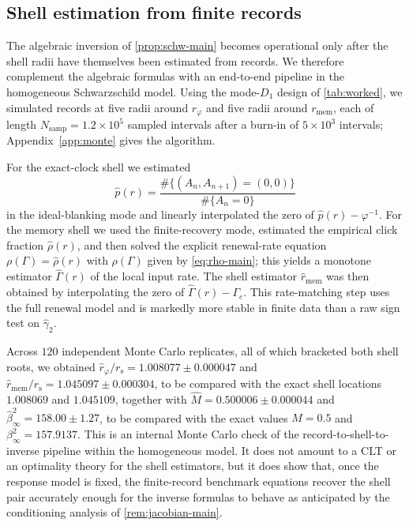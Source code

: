 \documentclass[11pt]{article}
\theoremstyle{definition}
\begin{document}


\subsection{Shell estimation from finite records}\label{subsec:noisy-inverse}

The algebraic inversion of \cref{prop:schw-main} becomes operational only after the shell radii have themselves been estimated from records. We therefore complement the algebraic formulas with an end-to-end pipeline in the homogeneous Schwarzschild model. Using the mode-$D_1$ design of \cref{tab:worked}, we simulated records at five radii around $r_\varphi$ and five radii around $r_{\mathrm{mem}}$, each of length $N_{\mathrm{samp}}=1.2\times10^5$ sampled intervals after a burn-in of $5\times10^3$ intervals; Appendix~\ref{app:monte} gives the algorithm.

For the exact-clock shell we estimated
\[
\widehat p(r)=\frac{\#\{(A_n,A_{n+1})=(0,0)\}}{\#\{A_n=0\}}
\]
in the ideal-blanking mode and linearly interpolated the zero of $\widehat p(r)-\varphi^{-1}$. For the memory shell we used the finite-recovery mode, estimated the empirical click fraction $\widehat\rho(r)$, and then solved the explicit renewal-rate equation $\rho(\Gamma)=\widehat\rho(r)$ with $\rho(\Gamma)$ given by \eqref{eq:rho-main}; this yields a monotone estimator $\widehat\Gamma(r)$ of the local input rate. The shell estimator $\widehat r_{\mathrm{mem}}$ was then obtained by interpolating the zero of $\widehat\Gamma(r)-\Gamma_c$. This rate-matching step uses the full renewal model and is markedly more stable in finite data than a raw sign test on $\widehat\gamma_2$.

Across $120$ independent Monte Carlo replicates, all of which bracketed both shell roots, we obtained $\widehat r_\varphi/r_{\mathrm s}=1.008077\pm0.000047$ and $\widehat r_{\mathrm{mem}}/r_{\mathrm s}=1.045097\pm0.000304$, to be compared with the exact shell locations $1.008069$ and $1.045109$, together with $\widehat M=0.500006\pm0.000044$ and $\widehat\beta_\infty^2=158.00\pm1.27$, to be compared with the exact values $M=0.5$ and $\beta_\infty^2=157.9137$. This is an internal Monte Carlo check of the record-to-shell-to-inverse pipeline within the homogeneous model. It does not amount to a CLT or an optimality theory for the shell estimators, but it does show that, once the response model is fixed, the finite-record benchmark equations recover the shell pair accurately enough for the inverse formulas to behave as anticipated by the conditioning analysis of \cref{rem:jacobian-main}.
\end{document}
